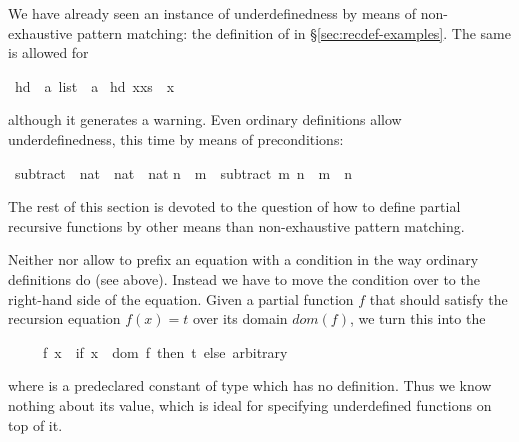 \begin{isabellebody}
\begin{isamarkuptext}
We have already seen an instance of underdefinedness by means of
non-exhaustive pattern matching: the definition of  in
\S\ref{sec:recdef-examples}. The same is allowed for %
\end{isamarkuptext}%
\isamarkuptrue%
\isamarkupfalse%
\ hd\ {\isacharcolon}{\isacharcolon}\ {\isachardoublequoteopen}{\isacharprime}a\ list\ {\isasymRightarrow}\ {\isacharprime}a{\isachardoublequoteclose}\isanewline
{}\isamarkupfalse%
\ {\isachardoublequoteopen}hd\ {\isacharparenleft}x{\isacharhash}xs{\isacharparenright}\ {\isacharequal}\ x{\isachardoublequoteclose}%
\begin{isamarkuptext}%
\noindent
although it generates a warning.
Even ordinary definitions allow underdefinedness, this time by means of
preconditions:%
\end{isamarkuptext}%
\isamarkuptrue%
\isamarkupfalse%
\ subtract\ {\isacharcolon}{\isacharcolon}\ {\isachardoublequoteopen}nat\ {\isasymRightarrow}\ nat\ {\isasymRightarrow}\ nat{\isachardoublequoteclose}\isanewline
{\isachardoublequoteopen}n\ {\isasymle}\ m\ {\isasymLongrightarrow}\ subtract\ m\ n\ {\isasymequiv}\ m\ {\isacharminus}\ n{\isachardoublequoteclose}%
\begin{isamarkuptext}%
The rest of this section is devoted to the question of how to define
partial recursive functions by other means than non-exhaustive pattern
matching.%
\end{isamarkuptext}%
\isamarkuptrue%
%
\isamarkuptrue%
%
\begin{isamarkuptext}%
%
Neither  nor  allow to
prefix an equation with a condition in the way ordinary definitions do
(see  above). Instead we have to move the condition over
to the right-hand side of the equation. Given a partial function $f$
that should satisfy the recursion equation $f(x) = t$ over its domain
$dom(f)$, we turn this into the 
\begin{isabelle}%
\ \ \ \ \ f\ x\ {\isacharequal}\ {\isacharparenleft}if\ x\ {\isasymin}\ dom\ f\ then\ t\ else\ arbitrary{\isacharparenright}%
\end{isabelle}
where  is a predeclared constant of type 
which has no definition. Thus we know nothing about its value,
which is ideal for specifying underdefined functions on top of it.


\end{isamarkuptext}
\end{isabellebody}
